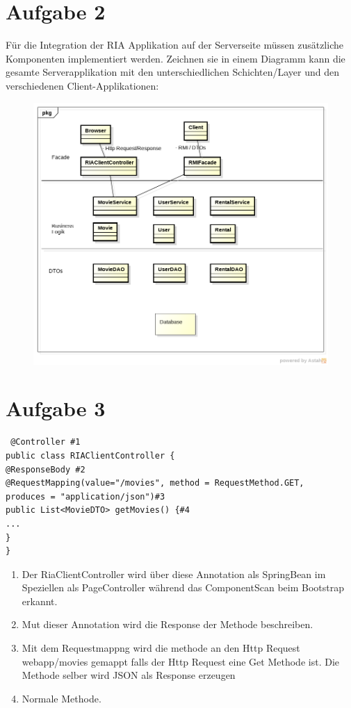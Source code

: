 \documentclass[a4paper,10pt]{scrreprt}
\begin{document}
\section*{Aufgabe 2}
Für die Integration der RIA Applikation auf der Serverseite müssen zusätzliche Komponenten
implementiert werden. Zeichnen sie in einem Diagramm kann die gesamte Serverapplikation mit den
unterschiedlichen Schichten/Layer und den verschiedenen Client-Applikationen:
\begin{figure}[h]
 \centering
 \includegraphics[scale=0.6]{./archan2.png}
\end{figure}
\section*{Aufgabe 3}
\begin{lstlisting}
 @Controller #1
public class RIAClientController {
@ResponseBody #2
@RequestMapping(value="/movies", method = RequestMethod.GET,
produces = "application/json")#3
public List<MovieDTO> getMovies() {#4
...
}
}
\end{lstlisting}
\begin{enumerate}
 \item Der RiaClientController wird über diese Annotation als SpringBean im Speziellen als PageController während das 
ComponentScan beim Bootstrap erkannt.
\item Mut dieser Annotation wird die Response der Methode beschreiben.
\item Mit dem Requestmappng wird die methode an den Http Request webapp/movies gemappt falls der Http Request eine Get 
Methode ist. Die Methode selber wird JSON als Response erzeugen
\item Normale Methode.
\end{enumerate}
\end{document}
